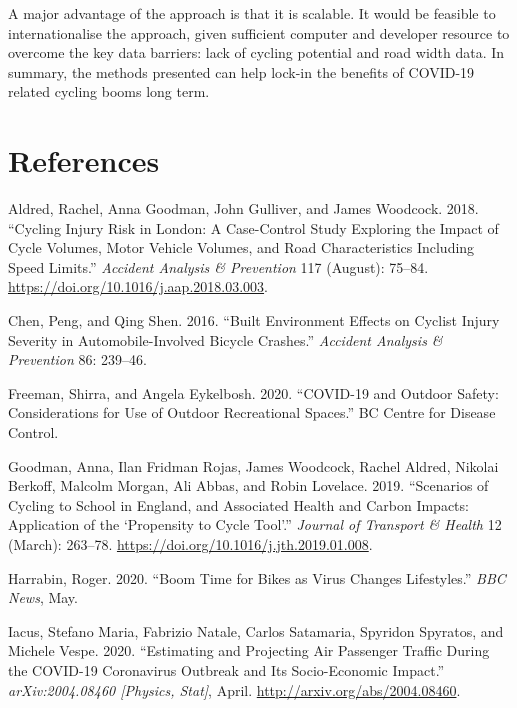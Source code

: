 \documentclass[
]{article}
\newlength{\cslhangindent}
\newenvironment{cslreferences}%
  {\setlength{\parindent}{0pt}%
  \everypar{\setlength{\hangindent}{\cslhangindent}}\ignorespaces}%
  {\par}
\begin{document}
A major advantage of the approach is that it is scalable.
It would be feasible to internationalise the approach, given sufficient computer and developer resource to overcome the key data barriers: lack of cycling potential and road width data.
In summary, the methods presented can help lock-in the benefits of COVID-19 related cycling booms long term.

\hypertarget{references}{%
\section*{References}\label{references}}

\hypertarget{refs}{}
\begin{cslreferences}
\leavevmode\hypertarget{ref-aldred_cycling_2018}{}%
Aldred, Rachel, Anna Goodman, John Gulliver, and James Woodcock. 2018. ``Cycling Injury Risk in London: A Case-Control Study Exploring the Impact of Cycle Volumes, Motor Vehicle Volumes, and Road Characteristics Including Speed Limits.'' \emph{Accident Analysis \& Prevention} 117 (August): 75--84. \url{https://doi.org/10.1016/j.aap.2018.03.003}.

\leavevmode\hypertarget{ref-chen_built_2016}{}%
Chen, Peng, and Qing Shen. 2016. ``Built Environment Effects on Cyclist Injury Severity in Automobile-Involved Bicycle Crashes.'' \emph{Accident Analysis \& Prevention} 86: 239--46.

\leavevmode\hypertarget{ref-freeman_covid19_2020}{}%
Freeman, Shirra, and Angela Eykelbosh. 2020. ``COVID-19 and Outdoor Safety: Considerations for Use of Outdoor Recreational Spaces.'' BC Centre for Disease Control.

\leavevmode\hypertarget{ref-goodman_scenarios_2019}{}%
Goodman, Anna, Ilan Fridman Rojas, James Woodcock, Rachel Aldred, Nikolai Berkoff, Malcolm Morgan, Ali Abbas, and Robin Lovelace. 2019. ``Scenarios of Cycling to School in England, and Associated Health and Carbon Impacts: Application of the `Propensity to Cycle Tool'.'' \emph{Journal of Transport \& Health} 12 (March): 263--78. \url{https://doi.org/10.1016/j.jth.2019.01.008}.

\leavevmode\hypertarget{ref-harrabin_boom_2020}{}%
Harrabin, Roger. 2020. ``Boom Time for Bikes as Virus Changes Lifestyles.'' \emph{BBC News}, May.

\leavevmode\hypertarget{ref-iacus_estimating_2020}{}%
Iacus, Stefano Maria, Fabrizio Natale, Carlos Satamaria, Spyridon Spyratos, and Michele Vespe. 2020. ``Estimating and Projecting Air Passenger Traffic During the COVID-19 Coronavirus Outbreak and Its Socio-Economic Impact.'' \emph{arXiv:2004.08460 {[}Physics, Stat{]}}, April. \url{http://arxiv.org/abs/2004.08460}.


\end{cslreferences}
\end{document}
